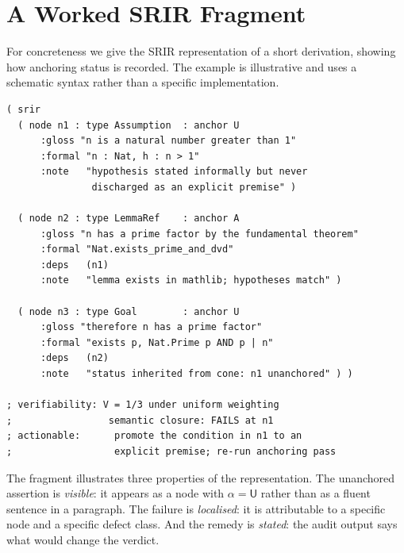 \documentclass[11pt,a4paper]{article}
\theoremstyle{definition}
\theoremstyle{plain}
\theoremstyle{remark}
\begin{document}
\section{A Worked SRIR Fragment}
\label{app:worked}

For concreteness we give the SRIR representation of a short derivation, showing
how anchoring status is recorded. The example is illustrative and uses a
schematic syntax rather than a specific implementation.

\begin{lstlisting}[caption={SRIR fragment for a two-step derivation. Note that the unanchored node is retained, not dropped, and that its status propagates to the goal.},label={lst:srir}]
( srir
  ( node n1 : type Assumption  : anchor U
      :gloss "n is a natural number greater than 1"
      :formal "n : Nat, h : n > 1"
      :note   "hypothesis stated informally but never
               discharged as an explicit premise" )

  ( node n2 : type LemmaRef    : anchor A
      :gloss "n has a prime factor by the fundamental theorem"
      :formal "Nat.exists_prime_and_dvd"
      :deps   (n1)
      :note   "lemma exists in mathlib; hypotheses match" )

  ( node n3 : type Goal        : anchor U
      :gloss "therefore n has a prime factor"
      :formal "exists p, Nat.Prime p AND p | n"
      :deps   (n2)
      :note   "status inherited from cone: n1 unanchored" ) )

; verifiability: V = 1/3 under uniform weighting
;                 semantic closure: FAILS at n1
; actionable:      promote the condition in n1 to an
;                  explicit premise; re-run anchoring pass
\end{lstlisting}

The fragment illustrates three properties of the representation. The unanchored
assertion is \emph{visible}: it appears as a node with $\alpha = \mathsf{U}$
rather than as a fluent sentence in a paragraph. The failure is
\emph{localised}: it is attributable to a specific node and a specific defect
class. And the remedy is \emph{stated}: the audit output says what would
change the verdict.
\end{document}
